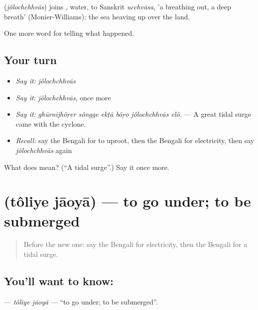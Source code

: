 \begin{cousinweb}
\textbf{} (\emph{jôlochchhvās}) joins \textbf{}, water, to Sanskrit \emph{ucchvāsa}, 'a breathing out, a deep breath' (Monier-Williams): the sea heaving up over the land.
\end{cousinweb}

\begin{grammarlens}[title={What you've built}]
One more word for telling what happened.
\end{grammarlens}

\subsection*{Your turn}
\begin{itemize}
\raggedright
  \item \emph{Say it:} \emph{jôlochchhvās}
  \item \emph{Say it:} \emph{jôlochchhvās}, once more
  \item \emph{Say it:} \emph{ghūrnijhôṛer sôngge ekṭā bôṛo jôlochchhvās elô.} — A great tidal surge came with the cyclone.
  \item \emph{Recall:} say the Bengali for to uproot, then the Bengali for electricity, then say \emph{jôlochchhvās} again
\end{itemize}

\begin{tcolorbox}[breakable,colback=teal!4,colframe=teal!35!black,title={Before you move on}]
What does  mean? (\textquotedblleft{}A tidal surge\textquotedblright{}.) Say it once more.
\end{tcolorbox}
\section[\texorpdfstring{\bn{তলিয়ে} \bn{যাওয়া} (tôliye jāoyā)}{তলিয়ে যাওয়া (tôliye jāoyā)}]{  (tôliye jāoyā) — to go under; to be submerged}

\label{lesson:BN-C289-toliye-jaoya}



\begin{quote}
Before the new one: say the Bengali for electricity, then the Bengali for a tidal surge.
\end{quote}

\subsection*{You'll want to know:  }
\textbf{ } — \emph{tôliye jāoyā} — \textquotedblleft{}to go under; to be submerged\textquotedblright{}.

